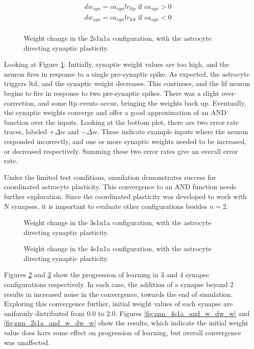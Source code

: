 \documentclass[conference]{IEEEtran}
\newcommand{\asvgf}[4]{
	\begin{figure}[htbp]
    	\centering
		\adjustbox{max width=#4\linewidth}{}
        \caption{#2.}
        \label{#3}
	\end{figure}
}
\begin{document}
\begin{align}
  dw_{syn} = ca_{syn} lr_{ltp} \textrm{ if } ca_{syn} >
  0 \label{eq:astro_and_dw} \\
  dw_{syn} = ca_{syn} lr_{ltd} \textrm{ if } ca_{syn} < 0 \\
\end{align}

\asvgf{figures/artifacts/obj3/snn_1n2s1a_and.svg}{Weight change in the 2s1n1a
  configuration, with the astrocyte directing synaptic
  plasticity}{fig:snn_2s1a_and_w_dw}{0.9}

Looking at Figure \ref{fig:snn_2s1a_and_w_dw}: Initially, synaptic weight values
are too high, and the neuron fires in response to a single pre-synaptic
spike. As expected, the astrocyte triggers \gls{ltd}, and the synaptic weight
decreases. This continues, and the \gls{lif} neuron begins to fire in response
to two pre-synaptic spikes. There was a slight over-correction, and some
\gls{ltp} events occur, bringing the weights back up. Eventually, the synaptic
weights converge and offer a good approximation of an AND function over the
inputs. Looking at the bottom plot, there are two error rate traces, labeled
$+\Delta w$ and $-\Delta w$. These indicate example inputs where the neuron
responded incorrectly, and one or more synaptic weights needed to be increased,
or decreased respectively. Summing these two error rates give an overall error
rate.

Under the limited test conditions, simulation demonstrates success for
coordinated astrocyte plasticity. This convergence to an AND function needs
further exploration. Since the coordinated plasticity was developed to work with
N synapses, it is important to evaluate other configurations besides $n=2$.

\asvgf{figures/artifacts/obj3/snn_1n3s1a_and.svg}{Weight change in the 3s1n1a
  configuration, with the astrocyte directing synaptic
  plasticity}{fig:snn_3s1a_and_w_dw}{0.9}

\asvgf{figures/artifacts/obj3/snn_1n4s1a_and.svg}{Weight change in the 4s1n1a
  configuration, with the astrocyte directing synaptic
  plasticity}{fig:snn_4s1a_and_w_dw}{0.9}

Figures \ref{fig:snn_3s1a_and_w_dw} and \ref{fig:snn_4s1a_and_w_dw} show the
progression of learning in 3 and 4 synapse configurations respectively. In each
case, the addition of a synapse beyond 2 results in increased noise in the
convergence, towards the end of simulation. Exploring this convergence further,
initial weight values of each synapse are uniformly distributed from $0.0$ to
$2.0$. Figures \ref{fig:snn_4s1a_and_w_dw_w} and \ref{fig:snn_2s1a_and_w_dw_w}
show the results, which indicate the initial weight value does have some effect
on progression of learning, but overall convergence was unaffected.
\end{document}
